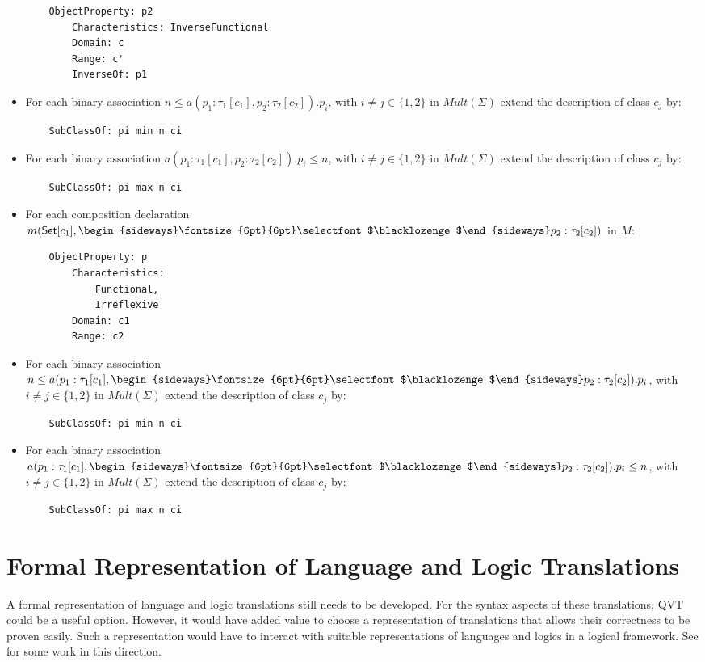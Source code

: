 \documentclass[10pt,fleqn,final]{scrreprt}
\newcommand{\sclause}[1]{\section{#1}}
\newenvironment{definitions}[0]{\medskip }{}
\newcommand{\composition}{\raisebox{0.2pt}{\begin{sideways}\fontsize{6pt}{6pt}\selectfont$\blacklozenge$\end{sideways}}}
\begin{document}
\begin{definitions}
\begin{itemize}
\begin{lstlisting}
	ObjectProperty: p2
		Characteristics: InverseFunctional
		Domain: c
		Range: c'
		InverseOf: p1
\end{lstlisting}
\item For each binary association $n \leq a(p_1:\tau_1[c_1],p_2:\tau_2[c_2]).p_i$, with $i \neq j\in\{1,2\}$ in $\mathit{Mult}(\Sigma)$ extend the description of class $c_j$ by:
\begin{lstlisting}
	SubClassOf: pi min n ci
\end{lstlisting}
\item For each binary association $a(p_1:\tau_1[c_1],p_2:\tau_2[c_2]).p_i \leq n$, with $i \neq j\in\{1,2\}$  in $\mathit{Mult}(\Sigma)$ extend the description of class $c_j$ by:
\begin{lstlisting}
	SubClassOf: pi max n ci
\end{lstlisting}
\item For each composition declaration $m(\mathsf{Set}[c_1], \composition p_2 :
\tau_2[c_2])$ in $M$:
\begin{lstlisting}
	ObjectProperty: p
		Characteristics:
			Functional, 
			Irreflexive
		Domain: c1
		Range: c2
\end{lstlisting}
\item For each binary association $n \leq a(p_1:\tau_1[c_1], \composition p_2:\tau_2[c_2]).p_i$, with $i \neq j\in\{1,2\}$  in $\mathit{Mult}(\Sigma)$  extend the description of class $c_j$ by:
\begin{lstlisting}
	SubClassOf: pi min n ci
\end{lstlisting}
\item For each binary association $a(p_1:\tau_1[c_1], \composition p_2:\tau_2[c_2]).p_i \leq n$, with $i \neq j\in\{1,2\}$  in $\mathit{Mult}(\Sigma)$ extend the description of class $c_j$ by:
\begin{lstlisting}
	SubClassOf: pi max n ci
\end{lstlisting}
\end{itemize}
 

\sclause{Formal Representation of Language and Logic Translations}
\label{sec:repr-trans}

A formal representation of language and logic translations still needs
to be developed. For the syntax aspects of these translations, QVT
could be a useful option. However, it would have added value to choose
a representation of translations that allows  their correctness
to be proven easily. Such a representation would have to interact
with suitable representations of languages and logics in a 
logical framework. See \cite{CodescuEtAl2011d} for some work
in this direction.



\end{definitions}
\end{document}
